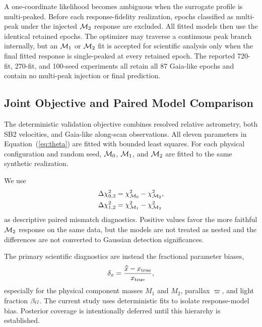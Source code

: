 A one-coordinate likelihood becomes ambiguous when the surrogate profile is multi-peaked. Before each response-fidelity realization, epochs classified as multi-peak under the injected $\mathcal{M}_2$ response are excluded. All fitted models then use the identical retained epochs. The optimizer may traverse a continuous peak branch internally, but an $\mathcal{M}_1$ or $\mathcal{M}_2$ fit is accepted for scientific analysis only when the final fitted response is single-peaked at every retained epoch. The reported 720-fit, 270-fit, and 100-seed experiments all retain all 87 Gaia-like epochs and contain no multi-peak injection or final prediction.

\subsection{Joint Objective and Paired Model Comparison}

The deterministic validation objective combines resolved relative astrometry, both SB2 velocities, and Gaia-like along-scan observations. All eleven parameters in Equation~(\ref{eq:theta}) are fitted with bounded least squares. For each physical configuration and random seed, $\mathcal{M}_0$, $\mathcal{M}_1$, and $\mathcal{M}_2$ are fitted to the same synthetic realization.

We use
\begin{align}
\Delta\chi^2_{0,2}&=\chi^2_{\mathcal{M}_0}-\chi^2_{\mathcal{M}_2},\\
\Delta\chi^2_{1,2}&=\chi^2_{\mathcal{M}_1}-\chi^2_{\mathcal{M}_2}
\end{align}
as descriptive paired mismatch diagnostics. Positive values favor the more faithful $\mathcal{M}_2$ response on the same data, but the models are not treated as nested and the differences are not converted to Gaussian detection significances.

The primary scientific diagnostics are instead the fractional parameter biases,
\begin{equation}
\delta_x=\frac{\widehat{x}-x_{\rm true}}{x_{\rm true}},
\label{eq:fracbias}
\end{equation}
especially for the physical component masses $M_1$ and $M_2$, parallax $\varpi$, and light fraction $\beta_G$. The current study uses deterministic fits to isolate response-model bias. Posterior coverage is intentionally deferred until this hierarchy is established.
